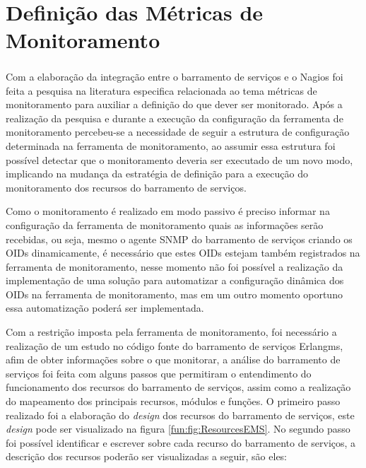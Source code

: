 
\section{Definição das Métricas de Monitoramento}
\label{metricas_monitoramento}

Com a elaboração da integração entre o barramento de serviços e o Nagios\textsuperscript{\textregistered} foi feita a pesquisa na literatura especifica relacionada ao tema métricas de monitoramento para auxiliar a definição do que dever ser monitorado. Após a realização da pesquisa e durante a execução da configuração da ferramenta de monitoramento percebeu-se a necessidade de seguir a estrutura de configuração determinada na ferramenta de monitoramento, ao assumir essa estrutura foi possível detectar que o monitoramento deveria ser executado de um novo modo, implicando na mudança da estratégia de definição para a execução do monitoramento dos recursos do barramento de serviços. 

Como o monitoramento é realizado em modo passivo é preciso informar na configuração da ferramenta de monitoramento quais as informações serão recebidas, ou seja, mesmo o agente \acrshort{SNMP} do barramento de serviços criando os \acrshort{OID}s dinamicamente, é necessário que estes \acrshort{OID}s estejam também registrados na ferramenta de monitoramento, nesse momento  não foi possível a realização da implementação de uma solução para automatizar a configuração dinâmica dos \acrshort{OID}s na ferramenta de monitoramento, mas em um outro momento oportuno essa automatização poderá ser implementada.

Com a restrição imposta pela ferramenta de monitoramento, foi necessário a realização de um estudo no código fonte do barramento de serviços Erlangms, afim de obter informações sobre o que monitorar, a análise do barramento de serviços foi feita com alguns passos que permitiram o entendimento do funcionamento dos recursos do barramento de serviços, assim como a realização do mapeamento dos principais recursos, módulos e funções. O primeiro passo realizado foi a elaboração do \textit{design} dos recursos do barramento de serviços, este \textit{design} pode ser visualizado na figura \ref{fun:fig:ResourcesEMS}. No segundo passo foi possível identificar e escrever sobre cada recurso do barramento de serviços, a descrição dos recursos poderão ser visualizadas a seguir, são eles:

